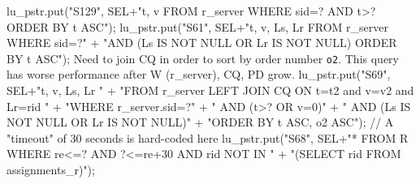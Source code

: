 \documentclass{article}
\def\nwendcode{\endtrivlist \endgroup}      %
\theoremstyle{definition}                   %
\begin{document}
lu_pstr.put("S129", SEL+"t, v FROM r_server WHERE sid=? AND t>? ORDER BY t ASC");
\eatline
{}\nwendcode{}\endmoddef{}
lu_pstr.put("S61", SEL+"t, v, Ls, Lr FROM r_server WHERE sid=?"
      + "AND (Ls IS NOT NULL OR Lr IS NOT NULL) ORDER BY t ASC");
\eatline
{}\nwendcode{}Need to join CQ in order to sort by order number {\tt{}o2}. This query has
worse performance after W (r\_server), CQ, PD grow.
\nwenddocs{}\endmoddef{}
lu_pstr.put("S69", SEL+"t, v, Ls, Lr "
      + "FROM r_server LEFT JOIN CQ ON t=t2 and v=v2 and Lr=rid "
      + "WHERE r_server.sid=?"
      + "   AND (t>? OR v=0)"
      + "   AND (Ls IS NOT NULL OR Lr IS NOT NULL)"
      + "ORDER BY t ASC, o2 ASC");
\eatline
{}\nwendcode{}\endmoddef{}
// A "timeout" of 30 seconds is hard-coded here
lu_pstr.put("S68", SEL+"* FROM R WHERE re<=? AND ?<=re+30 AND rid NOT IN  "
      + "(SELECT rid FROM assignments_r)");
\eatline
{}\nwendcode{}\endmoddef{}
\end{document}
